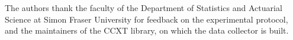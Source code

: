 \documentclass[sigconf,anonymous,review]{acmart}
\begin{document}


\begin{acks}
The authors thank the faculty of the Department of Statistics and Actuarial
Science at Simon Fraser University for feedback on the experimental protocol,
and the maintainers of the CCXT library, on which the data collector is built.
\end{acks}



\end{document}
